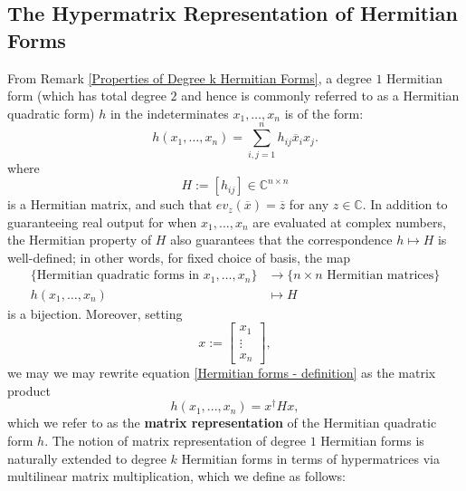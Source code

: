 \documentclass[11pt]{article}
\begin{document}
\subsection{The Hypermatrix Representation of Hermitian Forms}
From Remark \ref{Properties of Degree k Hermitian Forms}, a degree $1$ Hermitian form (which has total degree $2$ and hence is commonly referred to as a Hermitian quadratic form) $h$ in the indeterminates $x_1,\dots,x_n$ is of the form: 
\begin{equation}\label{Hermitian forms - definition}
    h(x_1,\dots,x_n) = \sum\limits_{i,j=1}^nh_{ij}\overline{x}_ix_j.
\end{equation}
where 
\[H := [h_{ij}]\in \mathbb{C}^{n\times n}\] 
is a Hermitian matrix, and such that $ev_z(\overline{x}) = \overline{z}$ for any $z\in \mathbb{C}$. In addition to guaranteeing real output for when $x_1,...,x_n$ are evaluated at complex numbers, the Hermitian property of $H$ also guarantees that the correspondence $h\mapsto H$ is well-defined; in other words, for fixed choice of basis, the map 
\begin{align*}
    \{\text{Hermitian quadratic forms in }x_1,\dots,x_n\} &\longrightarrow \{n\times n\text{ Hermitian matrices}\} \\
    h(x_1,\dots,x_n) &\mapsto H
\end{align*}
is a bijection. Moreover, setting 
\[x := \left[\begin{array}{c}
    x_1 \\
    \vdots \\
    x_n
\end{array}\right],\]
we may we may rewrite equation \eqref{Hermitian forms - definition} as the matrix product
\begin{equation}\label{Hermitian forms - matrix expression}
    h(x_1,...,x_n) = x^{\dagger}Hx,
\end{equation}
which we refer to as the \textbf{matrix representation} of the Hermitian quadratic form $h$. The notion of matrix representation of degree $1$ Hermitian forms is naturally extended to degree $k$ Hermitian forms in terms of hypermatrices via multilinear matrix multiplication, which we define as follows:
\end{document}
